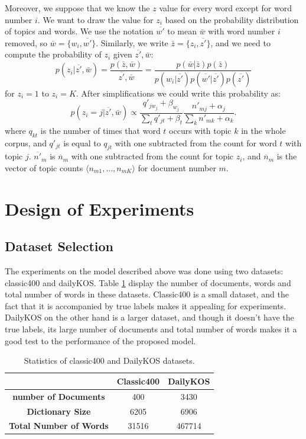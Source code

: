 \documentclass[twoside,12pt]{article}
\begin{document}
Moreover, we suppose that we know the $z$ value for every word except for word number $i$. We want to draw the value for $z_i$ based on the probability distribution of topics and words. We use the notation $\overline{w'}$ to mean $\bar{w}$ with word number $i$ removed, so $\bar{w}=\{w_i,\overline{w'}\}$. Similarly, we write $\bar{z}=\{z_i,\overline{z'}\}$, and we need to compute the probability of $z_i$ given $\overline{z'},\bar{w}$:
\begin{equation}
p(z_i|\overline{z'},\bar{w})=\frac{p(\bar{z},\bar{w})}{\overline{z'},\bar{w}}=\frac{p(\bar{w}|\bar{z})p(\bar{z})}{p(w_i|\overline{z'})p(\overline{w'}|\overline{z'})p(\overline{z'})}
\end{equation}
for $z_i=1$ to $z_i=K$. After simplifications we could write this probability as:
\begin{equation}
p(z_i=j|\overline{z'},\bar{w})\propto \frac{q'_{jw_j}+\beta_{w_j}}{\sum_t q'_{jt}+\beta_t}\frac{n'_{mj}+\alpha_j}{\sum_k n'_{mk}+\alpha_k}.
\end{equation}
where $q_{kt}$ is the number of times that word $t$ occurs with topic $k$ in the whole corpus, and $q'_{jt}$ is equal to $q_{jt}$ with one subtracted from the count for word $t$ with topic $j$. $\overline{n'}_{m}$ is $\overline{n}_m$ with one subtracted from the count for topic $z_i$, and $\overline{n}_m$ is the vector of topic counts $\langle n_{m1},\ldots,n_{mK} \rangle$ for document number $m$.

\section{Design of Experiments}

\subsection{Dataset Selection}
The experiments on the model described above was done using two datasets: classic400 and dailyKOS. Table \ref{tableDatasetStats} display the number of documents, words and total number of words in these datasets. Classic400 is a small dataset, and the fact that it is accompanied by true labels makes it appealing for experiments. DailyKOS on the other hand is a larger dataset, and though it doesn't have the true labels, its large number of documents and total number of words makes it a good test to the performance of the proposed model. 


\begin{table}
\vspace{-2cm}
\center
\begin{tabular}{|c|c|c|}
\hline
 & \textbf{Classic400} & \textbf{DailyKOS} \\
 \hline
\textbf{ number of Documents} & 400 & 3430 \\
\textbf{ Dictionary Size} & 6205 & 6906 \\
\textbf{ Total Number of Words} & 31516 & 467714\\
 \hline
\end{tabular}
\caption{Statistics of classic400 and DailyKOS datasets.}
\label{tableDatasetStats}
\end{table}
\end{document}
